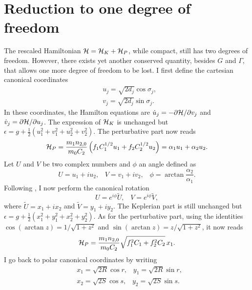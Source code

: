 \documentclass[12pt,a4paper,oneside]{article}
\begin{document}
\section{Reduction to one degree of freedom}\label{sec:1dof}

The rescaled Hamiltonian $\mathcal{H}=\mathcal{H}_K+\mathcal{H}_P$, while compact, still has two degrees of freedom. However, there exists yet another conserved quantity, besides $G$ and $\Gamma$, that allows one more degree of freedom to be lost. I first define the cartesian canonical coordinates
\begin{equation}
	\begin{split}
		&u_j=\sqrt{2d_j}\cos\sigma_j,\\
		&v_j=\sqrt{2d_j}\sin\sigma_j.
	\end{split}
\end{equation}
In these coordinates, the Hamilton equations are $\dot{u}_j=-\partial\mathcal{H}/\partial v_j$ and $\dot{v}_j=\partial\mathcal{H}/\partial u_j$. The expression of $\mathcal{H}_K$ is unchanged but $\epsilon=g+\frac{1}{2}\left(u_1^2+v_1^2+u_2^2+v_2^2\right)$. The perturbative part now reads
\begin{equation}
	\mathcal{H}_P=\frac{m_1n_{2,0}}{m_0C_2}\left(f_1C_1^{1/2}u_1+f_2C_2^{1/2}u_2\right)=\alpha_1u_1+\alpha_2u_2.
\end{equation}
Let $U$ and $V$ be two complex numbers and $\phi$ an angle defined as
\begin{equation}
	U=u_1+iu_2,\;\;\;V=v_1+iv_2,\;\;\;\phi=\arctan\frac{\alpha_2}{\alpha_1}.
\end{equation}
Following \cite{Henrard_et_al_1986}, I now perform the canonical rotation
\begin{equation}
	U=e^{i\phi}\tilde{U},\;\;\;V=e^{i\phi}\tilde{V},
\end{equation}
where $\tilde{U}=x_1+ix_2$ and $\tilde{V}=y_1+iy_2$. The Keplerian part is still unchanged but $\epsilon=g+\frac{1}{2}\left(x_1^2+y_1^2+x_2^2+y_2^2\right)$. As for the perturbative part, using the identities $\cos(\arctan z)=1/\sqrt{1+z^2}$ and $\sin(\arctan z)=z/\sqrt{1+z^2}$, it now reads
\begin{equation}
	\mathcal{H}_P=\frac{m_1n_{2,0}}{m_0C_2}\sqrt{f_1^2C_1+f_2^2C_2}\,x_1.
\end{equation}
I go back to polar canonical coordinates by writing
\begin{equation}
	\begin{split}
		&x_1=\sqrt{2R}\cos r,\;\;\;y_1=\sqrt{2R}\sin r,\\
		&x_2=\sqrt{2S}\cos s,\;\;\;y_2=\sqrt{2S}\sin s.
	\end{split}
\end{equation}
\end{document}
